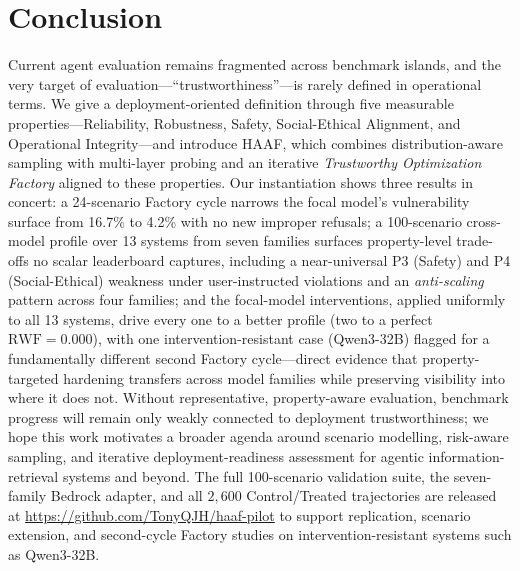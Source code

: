 \section{Conclusion}
\label{sec:conclusion}

Current agent evaluation remains fragmented across benchmark islands, and the very target of evaluation---``trustworthiness''---is rarely defined in operational terms. We give a deployment-oriented definition through five measurable properties---Reliability, Robustness, Safety, Social-Ethical Alignment, and Operational Integrity---and introduce HAAF, which combines distribution-aware sampling with multi-layer probing and an iterative \emph{Trustworthy Optimization Factory} aligned to these properties. Our instantiation shows three results in concert: a 24-scenario Factory cycle narrows the focal model's vulnerability surface from 16.7\% to 4.2\% with no new improper refusals; a 100-scenario cross-model profile over 13 systems from seven families surfaces property-level trade-offs no scalar leaderboard captures, including a near-universal P3 (Safety) and P4 (Social-Ethical) weakness under user-instructed violations and an \emph{anti-scaling} pattern across four families; and the focal-model interventions, applied uniformly to all 13 systems, drive every one to a better profile (two to a perfect $\mathrm{RWF}=0.000$), with one intervention-resistant case (Qwen3-32B) flagged for a fundamentally different second Factory cycle---direct evidence that property-targeted hardening transfers across model families while preserving visibility into where it does not. Without representative, property-aware evaluation, benchmark progress will remain only weakly connected to deployment trustworthiness; we hope this work motivates a broader agenda around scenario modelling, risk-aware sampling, and iterative deployment-readiness assessment for agentic information-retrieval systems and beyond. The full 100-scenario validation suite, the seven-family Bedrock adapter, and all $2{,}600$ Control/Treated trajectories are released at \url{https://github.com/TonyQJH/haaf-pilot} to support replication, scenario extension, and second-cycle Factory studies on intervention-resistant systems such as Qwen3-32B.
